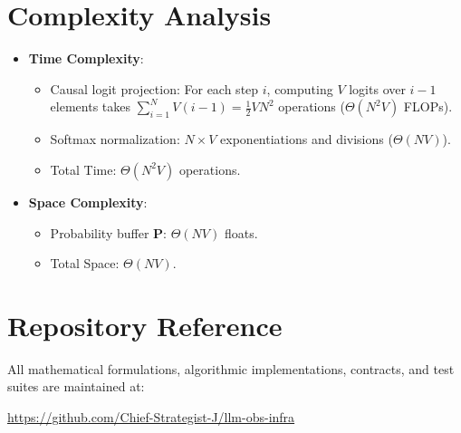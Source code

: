 \documentclass[11pt,a4paper]{article}
\theoremstyle{definition}
\begin{document}
\section{Complexity Analysis}
\begin{itemize}
    \item \textbf{Time Complexity}:
    \begin{itemize}
        \item Causal logit projection: For each step $i$, computing $V$ logits over $i-1$ elements takes $\sum_{i=1}^N V(i-1) = \frac{1}{2} V N^2$ operations ($\Theta(N^2 V)$ FLOPs).
        \item Softmax normalization: $N \times V$ exponentiations and divisions ($\Theta(N V)$).
        \item Total Time: $\Theta(N^2 V)$ operations.
    \end{itemize}
    \item \textbf{Space Complexity}:
    \begin{itemize}
        \item Probability buffer $\mathbf{P}$: $\Theta(N V)$ floats.
        \item Total Space: $\Theta(N V)$.
    \end{itemize}
\end{itemize}

\section{Repository Reference}
All mathematical formulations, algorithmic implementations, contracts, and test suites are maintained at:
\begin{center}
\url{https://github.com/Chief-Strategist-J/llm-obs-infra}
\end{center}
\end{document}
